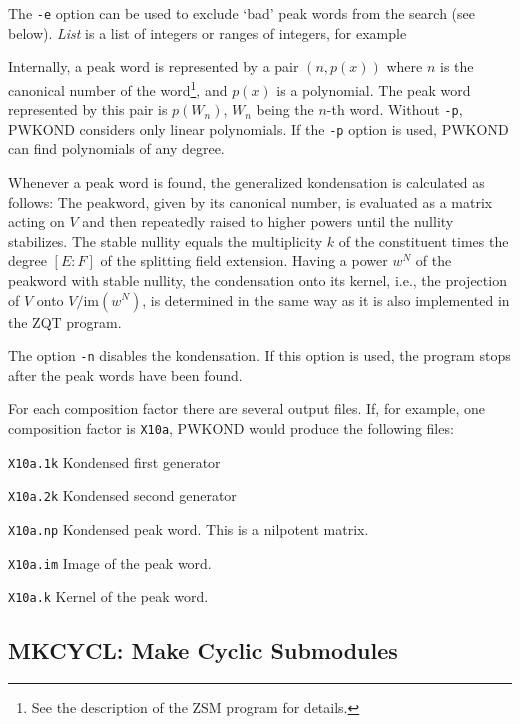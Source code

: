 The {\tt -e} option can be used to exclude `bad' peak words from
the search (see below). {\it List} is a list of integers or ranges
of integers, for example

Internally, a peak word is represented by a pair $(n,p(x))$ where $n$ is
the canonical number of the word\footnote{See the description of the ZSM
program for details.}, and $p(x)$ is a polynomial. The peak
word represented by this pair is $p(W_n)$, $W_n$ being the $n$-th word.
Without \verb"-p", PWKOND considers only linear polynomials. If the 
\verb"-p" option is used, PWKOND can find polynomials of any degree.

Whenever a peak word is found, the generalized kondensation 
is calculated as follows: The
peakword, given by its canonical number, is evaluated as a matrix
acting on $V$ and then repeatedly raised to higher powers until the
nullity stabilizes. The stable nullity equals the multiplicity $k$
of the constituent times the degree $[E:F]$ of the splitting field
extension. Having a power $w^{N}$ of the peakword with stable
nullity, the condensation onto its kernel, i.e.,
the projection of $V$ onto $V/\mbox{im}(w^{N})$, is determined in
the same way as it is also implemented in the ZQT program.

The option \verb"-n" disables the kondensation. If this option is used,
the program stops after the peak words have been found.



For each composition factor there are several output files. If, for
example, one composition factor is \verb"X10a", PWKOND would produce
the following files:
\begin{list}{}{\leftmargin 14mm  \parsep 0mm
\itemsep 0mm}
\item[\tt X10a.1k\hfill] Kondensed first generator
\item[\tt X10a.2k\hfill] Kondensed second generator
\item[\tt X10a.np\hfill] Kondensed peak word. This is a nilpotent
	matrix.
\item[\tt X10a.im\hfill] Image of the peak word.
\item[\tt X10a.k\hfill] Kernel of the peak word.
\end{list}


\subsection{MKCYCL: Make Cyclic Submodules}
\Syntax
{}

